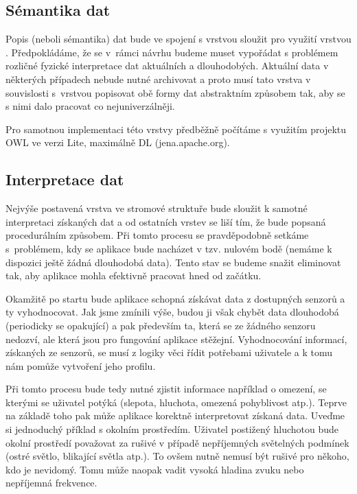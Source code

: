 \documentclass[thesis=M,czech]{FITthesis}[2012/06/26]
\begin{document}
\subsection{Sémantika dat}
Popis (neboli sémantika) dat bude ve spojení s vrstvou  sloužit pro využití vrstvou . Předpokládáme, že se v~rámci návrhu budeme muset vypořádat s problémem rozličné fyzické interpretace dat aktuálních a dlouhodobých. Aktuální data v některých případech nebude nutné archivovat a proto musí tato vrstva v souvislosti s~vrstvou  popisovat obě formy dat abstraktním způsobem tak, aby se s nimi dalo pracovat co nejuniverzálněji.

Pro samotnou implementaci této vrstvy předběžně počítáme s využitím projektu OWL ve verzi Lite, maximálně DL (jena.apache.org).

\subsection{Interpretace dat}
Nejvýše postavená vrstva ve stromové struktuře bude sloužit k samotné interpretaci získaných dat a od ostatních vrstev se liší tím, že bude popsaná procedurálním způsobem. Při tomto procesu se pravděpodobně setkáme s~problémem, kdy se aplikace bude nacházet v tzv. nulovém bodě (nemáme k dispozici ještě žádná dlouhodobá data). Tento stav se budeme snažit eliminovat tak, aby aplikace mohla efektivně pracovat hned od začátku.

Okamžitě po startu bude aplikace schopná získávat data z dostupných senzorů a ty vyhodnocovat. Jak jsme zmínili výše, budou ji však chybět data dlouhodobá (periodicky se opakující) a pak především ta, která se ze žádného senzoru nedozví, ale která jsou pro fungování aplikace stěžejní. Vyhodnocování informací, získaných ze senzorů, se musí z logiky věci řídit potřebami uživatele a k tomu nám pomůže vytvoření jeho profilu.

Při tomto procesu bude tedy nutné zjistit informace například o omezení, se kterými se uživatel potýká (slepota, hluchota, omezená pohyblivost atp.). Teprve na základě toho pak může aplikace korektně interpretovat získaná data. Uveďme si jednoduchý příklad s okolním prostředím. Uživatel postižený hluchotou bude okolní prostředí považovat za rušivé v případě nepříjemných světelných podmínek (ostré světlo, blikající světla atp.). To ovšem nutně nemusí být rušivé pro někoho, kdo je nevidomý. Tomu může naopak vadit vysoká hladina zvuku nebo nepříjemná frekvence.
\end{document}

